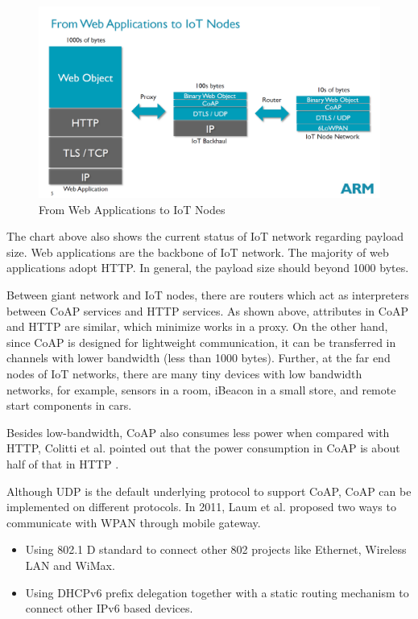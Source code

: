 \documentclass{Nan_Thesis}
\begin{document}
\begin{figure}[h]
  \centering 
      \includegraphics[scale=1]{pic/coapusecase.png} 
  \caption{From Web Applications to IoT Nodes \cite{armcoaptutorial2014}}
\end{figure}

The chart above also shows the current status of IoT network regarding payload size. 
Web applications are the backbone of IoT network. The majority of web applications adopt HTTP. In general, the payload size should beyond 1000 bytes.

Between giant network and IoT nodes, there are routers which act as interpreters between CoAP services and HTTP services. As shown above, attributes in CoAP and HTTP are similar, which minimize works in a proxy. On the other hand, since CoAP is designed for lightweight communication, it can be transferred in channels with lower bandwidth (less than 1000 bytes). Further, at the far end nodes of IoT networks, there are many tiny devices with low bandwidth networks, for example, sensors in a room, iBeacon in a small store, and remote start components in cars.

Besides low-bandwidth, CoAP also consumes less power when compared with HTTP, Colitti et al. pointed out that the power consumption in CoAP is about half of that in HTTP \cite{colitti2011integrating}.

Although UDP is the default underlying protocol to support CoAP, CoAP can be implemented on different protocols. In 2011, Laum et al. \cite{laum2012web} proposed two ways to communicate with WPAN through mobile gateway.

\begin{itemize}
  \item Using 802.1 D standard to connect other 802 projects like Ethernet, Wireless LAN and WiMax.
  \item Using DHCPv6 prefix delegation together with a static routing mechanism to connect other IPv6 based devices. 
\end{itemize} 
\end{document}

